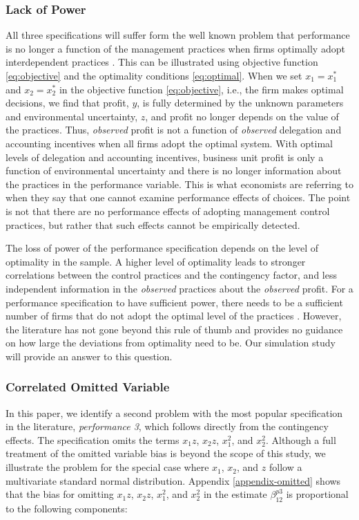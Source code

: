 \documentclass[12pt]{article}
\begin{document}
\subsubsection{Lack of Power}

All three specifications will suffer form the well known problem that performance is no longer a function of the management practices when firms optimally adopt interdependent practices \citep{grabner_management_2013}. This can be illustrated using objective function \eqref{eq:objective} and the optimality conditions \eqref{eq:optimal}. When we set $x_1 = x_1^*$ and $x_2 = x_2^*$ in the objective function  \eqref{eq:objective}, i.e., the firm makes optimal decisions, we find that profit, $y$, is fully determined by the unknown parameters and environmental uncertainty, $z$, and profit no longer depends on the value of the practices. Thus, \textit{observed} profit is not a function of \textit{observed} delegation and accounting incentives when all firms adopt the optimal system. With optimal levels of delegation and accounting incentives, business unit profit is only a function of environmental uncertainty and there is no longer information about the practices in the performance variable. This is what economists are referring to when they say that one cannot examine performance effects of choices. The point is not that there are no performance effects of adopting management control practices, but rather that such effects cannot be empirically detected. 

The loss of power of the performance specification depends on the level of optimality in the sample. A higher level of optimality leads to stronger  correlations between the control practices and the contingency factor, and less independent information in the \textit{observed} practices about the \textit{observed} profit. For a performance specification to have sufficient power, there needs to be a sufficient number of firms that do not adopt the optimal level of the practices \citep{bedford_management_2016, carree_note_2011, hofmann_organizational_2017}. However, the literature has not gone beyond this rule of thumb and provides no guidance on how large the deviations from optimality need to be. Our simulation study will provide an answer to this question.

\subsubsection{Correlated Omitted Variable}

In this paper, we identify a second problem with the most popular specification in the literature, \emph{performance 3}, which follows directly from the contingency effects. The specification omits the terms $x_1 z$, $x_2 z$, $x_1^2$, and $x_2^2$. Although a full treatment of the omitted variable bias is beyond the scope of this study, we illustrate the problem for the special case where $x_1$, $x_2$, and $z$ follow a multivariate standard normal distribution. Appendix \ref{appendix-omitted} shows that the bias for omitting $x_1 z$, $x_2 z$, $x_1^2$, and $x_2^2$ in the estimate $\beta^{p3}_{12}$ is proportional to the following components:
\end{document}
